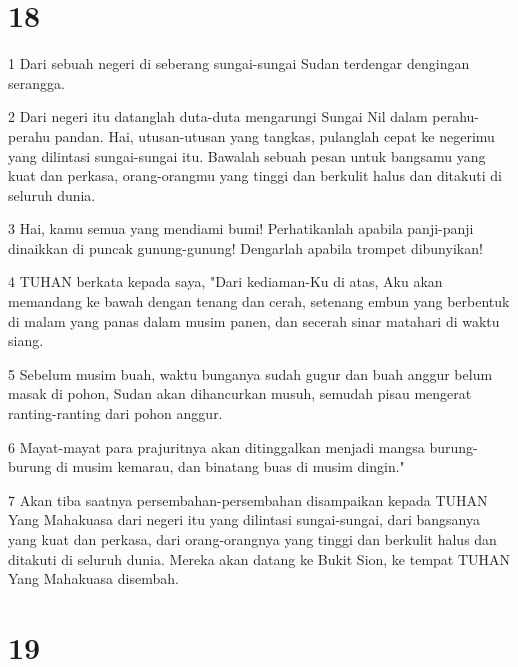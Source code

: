\chapter{18}

\par 1 Dari sebuah negeri di seberang sungai-sungai Sudan terdengar dengingan serangga.
\par 2 Dari negeri itu datanglah duta-duta mengarungi Sungai Nil dalam perahu-perahu pandan. Hai, utusan-utusan yang tangkas, pulanglah cepat ke negerimu yang dilintasi sungai-sungai itu. Bawalah sebuah pesan untuk bangsamu yang kuat dan perkasa, orang-orangmu yang tinggi dan berkulit halus dan ditakuti di seluruh dunia.
\par 3 Hai, kamu semua yang mendiami bumi! Perhatikanlah apabila panji-panji dinaikkan di puncak gunung-gunung! Dengarlah apabila trompet dibunyikan!
\par 4 TUHAN berkata kepada saya, "Dari kediaman-Ku di atas, Aku akan memandang ke bawah dengan tenang dan cerah, setenang embun yang berbentuk di malam yang panas dalam musim panen, dan secerah sinar matahari di waktu siang.
\par 5 Sebelum musim buah, waktu bunganya sudah gugur dan buah anggur belum masak di pohon, Sudan akan dihancurkan musuh, semudah pisau mengerat ranting-ranting dari pohon anggur.
\par 6 Mayat-mayat para prajuritnya akan ditinggalkan menjadi mangsa burung-burung di musim kemarau, dan binatang buas di musim dingin."
\par 7 Akan tiba saatnya persembahan-persembahan disampaikan kepada TUHAN Yang Mahakuasa dari negeri itu yang dilintasi sungai-sungai, dari bangsanya yang kuat dan perkasa, dari orang-orangnya yang tinggi dan berkulit halus dan ditakuti di seluruh dunia. Mereka akan datang ke Bukit Sion, ke tempat TUHAN Yang Mahakuasa disembah.

\chapter{19}


